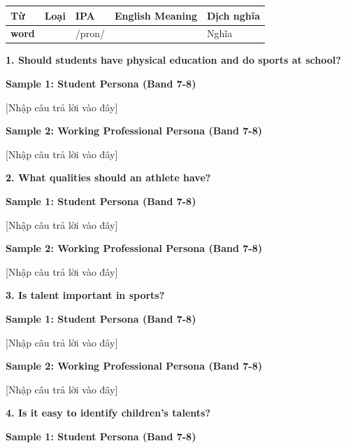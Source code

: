 \vspace{0.8em}
\begin{center}
\renewcommand{\arraystretch}{1.65}
\begin{tabularx}{\textwidth}{|V{0.22\textwidth}|C{0.07\textwidth}|I{0.20\textwidth}|Y|V{0.18\textwidth}|}
\hline
{}
\textbf{Từ} & \textbf{Loại} & \textbf{IPA} & \textbf{English Meaning} & \textbf{Dịch nghĩa} \\
\hline
\textbf{word} & & /pron/ & & Nghĩa \\ \hline
\end{tabularx}
\end{center}

\partthreeheader

\begin{ieltsquestion}
\textbf{1. Should students have physical education and do sports at school?}
\end{ieltsquestion}
\textbf{Sample 1: Student Persona (Band 7-8)}

[Nhập câu trả lời vào đây]

\textbf{Sample 2: Working Professional Persona (Band 7-8)}

[Nhập câu trả lời vào đây]

\separator

\begin{ieltsquestion}
\textbf{2. What qualities should an athlete have?}
\end{ieltsquestion}
\textbf{Sample 1: Student Persona (Band 7-8)}

[Nhập câu trả lời vào đây]

\textbf{Sample 2: Working Professional Persona (Band 7-8)}

[Nhập câu trả lời vào đây]

\separator

\begin{ieltsquestion}
\textbf{3. Is talent important in sports?}
\end{ieltsquestion}
\textbf{Sample 1: Student Persona (Band 7-8)}

[Nhập câu trả lời vào đây]

\textbf{Sample 2: Working Professional Persona (Band 7-8)}

[Nhập câu trả lời vào đây]

\separator

\begin{ieltsquestion}
\textbf{4. Is it easy to identify children's talents?}
\end{ieltsquestion}
\textbf{Sample 1: Student Persona (Band 7-8)}

